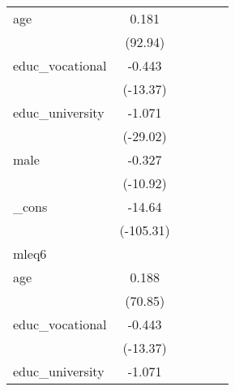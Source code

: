 {\begin{tabular}{l*{5}{c}}
age         &       0.181\sym{***}&                     &                     &                     &                     \\
            &     (92.94)         &                     &                     &                     &                     \\
[1em]
educ\_vocational&      -0.443\sym{***}&                     &                     &                     &                     \\
            &    (-13.37)         &                     &                     &                     &                     \\
[1em]
educ\_university&      -1.071\sym{***}&                     &                     &                     &                     \\
            &    (-29.02)         &                     &                     &                     &                     \\
[1em]
male        &      -0.327\sym{***}&                     &                     &                     &                     \\
            &    (-10.92)         &                     &                     &                     &                     \\
[1em]
\_cons      &      -14.64\sym{***}&                     &                     &                     &                     \\
            &   (-105.31)         &                     &                     &                     &                     \\
\hline
mleq6       &                     &                     &                     &                     &                     \\
age         &       0.188\sym{***}&                     &                     &                     &                     \\
            &     (70.85)         &                     &                     &                     &                     \\
[1em]
educ\_vocational&      -0.443\sym{***}&                     &                     &                     &                     \\
            &    (-13.37)         &                     &                     &                     &                     \\
[1em]
educ\_university&      -1.071\sym{***}&                     &                     &                     &                     \\

\end{tabular}}
